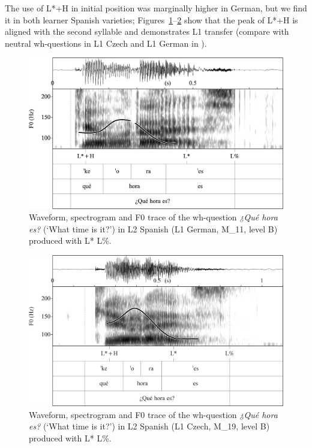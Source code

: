  The use of L*+H in initial position was marginally higher in German, but we find it in both learner Spanish varieties; Figures~\ref{fig:4.115}--\ref{fig:4.116} show that the peak of L*+H is aligned with the second syllable and demonstrates L1 transfer (compare with neutral wh-questions in L1 Czech and L1 German in ).

\begin{figure}


\includegraphics[width=\textwidth]{figures/Figure_4.115.png}


\caption{Waveform, spectrogram and F0 trace of the wh-question \textit{¿Qué hora es?} (‘What time is it?’) in L2 Spanish (L1 German, M\_11, level B) produced with L* L\%.}
\label{fig:4.115}
\end{figure}

\begin{figure}


\includegraphics[width=\textwidth]{figures/Figure_4.116.png}



\caption{Waveform, spectrogram and F0 trace of the wh-question \textit{¿Qué hora es?} (‘What time is it?’) in L2 Spanish (L1 Czech, M\_19, level B) produced with L* L\%.}
\label{fig:4.116}
\end{figure}

